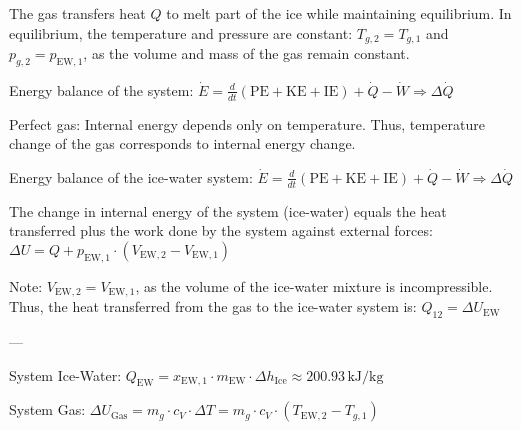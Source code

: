 The gas transfers heat \( Q \) to melt part of the ice while maintaining equilibrium.  
In equilibrium, the temperature and pressure are constant:  
\( T_{g,2} = T_{g,1} \) and \( p_{g,2} = p_{\text{EW},1} \), as the volume and mass of the gas remain constant.  

Energy balance of the system:  
\( \dot{E} = \frac{d}{dt} (\text{PE} + \text{KE} + \text{IE}) + \dot{Q} - \dot{W} \Rightarrow \Delta \dot{Q} \)  

Perfect gas:  
Internal energy depends only on temperature.  
Thus, temperature change of the gas corresponds to internal energy change.  

Energy balance of the ice-water system:  
\( \dot{E} = \frac{d}{dt} (\text{PE} + \text{KE} + \text{IE}) + \dot{Q} - \dot{W} \Rightarrow \Delta \dot{Q} \)  

The change in internal energy of the system (ice-water) equals the heat transferred plus the work done by the system against external forces:  
\( \Delta U = Q + p_{\text{EW},1} \cdot (V_{\text{EW},2} - V_{\text{EW},1}) \)  

Note:  
\( V_{\text{EW},2} = V_{\text{EW},1} \), as the volume of the ice-water mixture is incompressible.  
Thus, the heat transferred from the gas to the ice-water system is:  
\( Q_{12} = \Delta U_{\text{EW}} \)  

---

System Ice-Water:  
\( Q_{\text{EW}} = x_{\text{EW},1} \cdot m_{\text{EW}} \cdot \Delta h_{\text{Ice}} \approx 200.93 \, \text{kJ/kg} \)  

System Gas:  
\( \Delta U_{\text{Gas}} = m_g \cdot c_V \cdot \Delta T = m_g \cdot c_V \cdot (T_{\text{EW},2} - T_{g,1}) \)